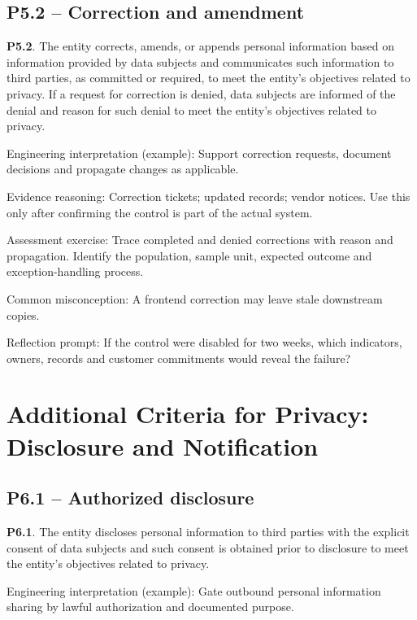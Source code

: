 \documentclass[10pt,oneside]{report}
\begin{document}
\subsection{P5.2 -- Correction and amendment}
\begin{aicpabox}
\textbf{P5.2}. The entity corrects, amends, or appends personal information based on information provided by data subjects and communicates such information to third parties, as committed or required, to meet the entity's objectives related to privacy. If a request for correction is denied, data subjects are informed of the denial and reason for such denial to meet the entity's objectives related to privacy.\par{}
\end{aicpabox}
Engineering interpretation (example): Support correction requests, document decisions and propagate changes as applicable.

Evidence reasoning: Correction tickets; updated records; vendor notices. Use this only after confirming the control is part of the actual system.

Assessment exercise: Trace completed and denied corrections with reason and propagation. Identify the population, sample unit, expected outcome and exception-handling process.

Common misconception: A frontend correction may leave stale downstream copies.

Reflection prompt: If the control were disabled for two weeks, which indicators, owners, records and customer commitments would reveal the failure?

\section{Additional Criteria for Privacy: Disclosure and Notification}
\subsection{P6.1 -- Authorized disclosure}
\begin{aicpabox}
\textbf{P6.1}. The entity discloses personal information to third parties with the explicit consent of data subjects and such consent is obtained prior to disclosure to meet the entity's objectives related to privacy.\par{}
\end{aicpabox}
Engineering interpretation (example): Gate outbound personal information sharing by lawful authorization and documented purpose.
\end{document}
